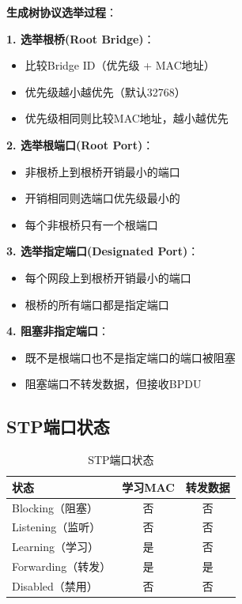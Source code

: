 \documentclass[12pt,a4paper]{ctexart}
\begin{document}
\begin{keybox}
\textbf{生成树协议选举过程}：

\textbf{1. 选举根桥(Root Bridge)}：
\begin{itemize}[itemsep=0pt]
    \item 比较Bridge ID（优先级 + MAC地址）
    \item 优先级越小越优先（默认32768）
    \item 优先级相同则比较MAC地址，越小越优先
\end{itemize}

\textbf{2. 选举根端口(Root Port)}：
\begin{itemize}[itemsep=0pt]
    \item 非根桥上到根桥开销最小的端口
    \item 开销相同则选端口优先级最小的
    \item 每个非根桥只有一个根端口
\end{itemize}

\textbf{3. 选举指定端口(Designated Port)}：
\begin{itemize}[itemsep=0pt]
    \item 每个网段上到根桥开销最小的端口
    \item 根桥的所有端口都是指定端口
\end{itemize}

\textbf{4. 阻塞非指定端口}：
\begin{itemize}[itemsep=0pt]
    \item 既不是根端口也不是指定端口的端口被阻塞
    \item 阻塞端口不转发数据，但接收BPDU
\end{itemize}
\end{keybox}

\subsection{STP端口状态}

\begin{table}[htbp]
\centering
\begin{tabular}{lcc}
\toprule
\textbf{状态} & \textbf{学习MAC} & \textbf{转发数据} \\
\midrule
Blocking（阻塞） & 否 & 否 \\
Listening（监听） & 否 & 否 \\
Learning（学习） & 是 & 否 \\
Forwarding（转发） & 是 & 是 \\
Disabled（禁用） & 否 & 否 \\
\bottomrule
\end{tabular}
\caption{STP端口状态}
\end{table}
\end{document}
